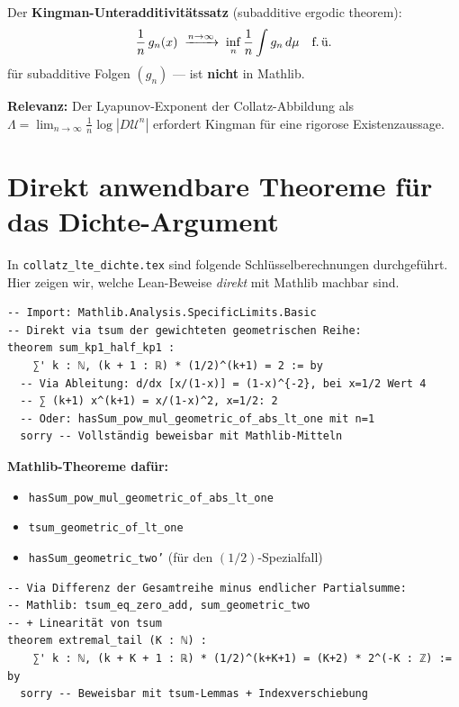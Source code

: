 \documentclass[12pt,a4paper]{article}
\begin{document}
\begin{tcolorbox}[lücke, title={Fehlt: Kingman-Subadditivitätssatz}]
Der \textbf{Kingman-Unteradditivitätssatz} (subadditive ergodic theorem):
\[
  \frac{1}{n}\,g_n(x) \;\xrightarrow{n\to\infty}\; \inf_n \frac{1}{n}\int g_n\,d\mu
  \quad\text{f.\,ü.}
\]
für subadditive Folgen $(g_n)$ --- ist \textbf{nicht} in Mathlib.

\textbf{Relevanz:} Der Lyapunov-Exponent der Collatz-Abbildung als
$\Lambda = \lim_{n\to\infty}\frac{1}{n}\log|D\mathcal{U}^n|$ erfordert Kingman für
eine rigorose Existenzaussage.
\end{tcolorbox}

\section{Direkt anwendbare Theoreme für das Dichte-Argument}
\label{sec:direkt}

In \texttt{collatz\_lte\_dichte.tex} sind folgende Schlüsselberechnungen durchgeführt.
Hier zeigen wir, welche Lean-Beweise \emph{direkt} mit Mathlib machbar sind.

\begin{tcolorbox}[vorhanden, title={Beweisbar: Konvergenz $\sum(k+1)\cdot 2^{-(k+1)} = 2$}]
\begin{lstlisting}[language=Lean4]
-- Import: Mathlib.Analysis.SpecificLimits.Basic
-- Direkt via tsum der gewichteten geometrischen Reihe:
theorem sum_kp1_half_kp1 :
    ∑' k : ℕ, (k + 1 : ℝ) * (1/2)^(k+1) = 2 := by
  -- Via Ableitung: d/dx [x/(1-x)] = (1-x)^{-2}, bei x=1/2 Wert 4
  -- ∑ (k+1) x^(k+1) = x/(1-x)^2, x=1/2: 2
  -- Oder: hasSum_pow_mul_geometric_of_abs_lt_one mit n=1
  sorry -- Vollständig beweisbar mit Mathlib-Mitteln
\end{lstlisting}

\textbf{Mathlib-Theoreme dafür:}
\begin{itemize}[nosep]
  \item \texttt{hasSum\_pow\_mul\_geometric\_of\_abs\_lt\_one}
  \item \texttt{tsum\_geometric\_of\_lt\_one}
  \item \texttt{hasSum\_geometric\_two'} (für den $(1/2)$-Spezialfall)
\end{itemize}
\end{tcolorbox}

\begin{tcolorbox}[vorhanden, title={Beweisbar: Tail-Formel $\sum_{k=K}^\infty (k+1)\cdot 2^{-(k+1)} = (K+2)\cdot 2^{-K}$}]
\begin{lstlisting}[language=Lean4]
-- Via Differenz der Gesamtreihe minus endlicher Partialsumme:
-- Mathlib: tsum_eq_zero_add, sum_geometric_two
-- + Linearität von tsum
theorem extremal_tail (K : ℕ) :
    ∑' k : ℕ, (k + K + 1 : ℝ) * (1/2)^(k+K+1) = (K+2) * 2^(-K : ℤ) := by
  sorry -- Beweisbar mit tsum-Lemmas + Indexverschiebung
\end{lstlisting}
\end{tcolorbox}
\end{document}
